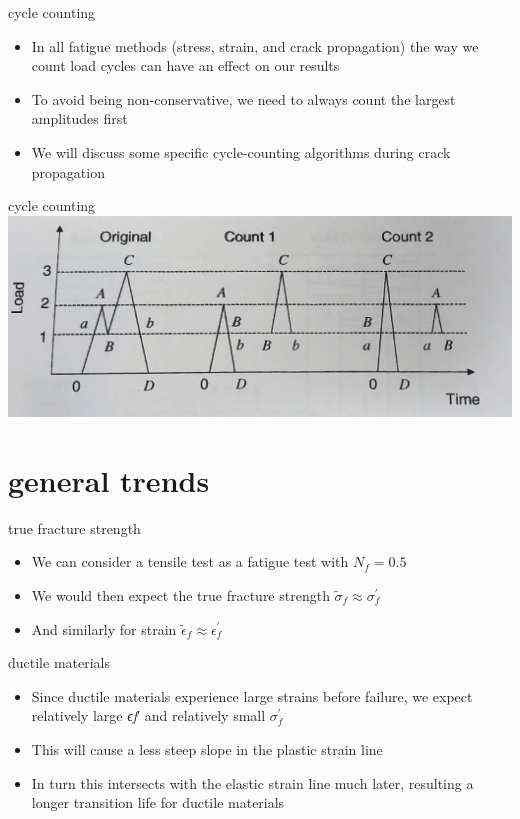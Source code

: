 \documentclass[
  letterpaper,
  ignorenonframetext,
  aspectratio=43,
  handout,
  12pt]{beamer}
\providecommand{\tightlist}{%
  \setlength{\itemsep}{0pt}\setlength{\parskip}{0pt}}
\providecommand{\tightlist}{%
\setlength{\itemsep}{0pt}\setlength{\parskip}{0pt}}
\let\Oldincludegraphics\includegraphics
\renewcommand{\includegraphics}[2][]{\Oldincludegraphics[width=\textwidth,height=0.7\textheight,keepaspectratio]{#2}}
\begin{document}
\begin{frame}{cycle counting}
\protect\hypertarget{cycle-counting}{}
\begin{itemize}
\tightlist
\item
  In all fatigue methods (stress, strain, and crack propagation) the way
  we count load cycles can have an effect on our results
\item
  To avoid being non-conservative, we need to always count the largest
  amplitudes first
\item
  We will discuss some specific cycle-counting algorithms during crack
  propagation
\end{itemize}
\end{frame}

\begin{frame}{cycle counting}
\protect\hypertarget{cycle-counting-1}{}
\includegraphics{../images/cycle_counting.jpg}
\end{frame}

\hypertarget{general-trends}{%
\section{general trends}\label{general-trends}}

\begin{frame}{true fracture strength}
\protect\hypertarget{true-fracture-strength}{}
\begin{itemize}
\tightlist
\item
  We can consider a tensile test as a fatigue test with \(N_f = 0.5\)
\item
  We would then expect the true fracture strength
  \(\tilde{\sigma}_f \approx \sigma_f^\prime\)
\item
  And similarly for strain
  \(\tilde{\epsilon}_f \approx \epsilon_f^\prime\)
\end{itemize}
\end{frame}

\begin{frame}{ductile materials}
\protect\hypertarget{ductile-materials}{}
\begin{itemize}
\tightlist
\item
  Since ductile materials experience large strains before failure, we
  expect relatively large \emph{ϵ}\emph{f}′ and relatively small
  \(\sigma_f^\prime\)
\item
  This will cause a less steep slope in the plastic strain line
\item
  In turn this intersects with the elastic strain line much later,
  resulting a longer transition life for ductile materials
\end{itemize}
\end{frame}
\end{document}

